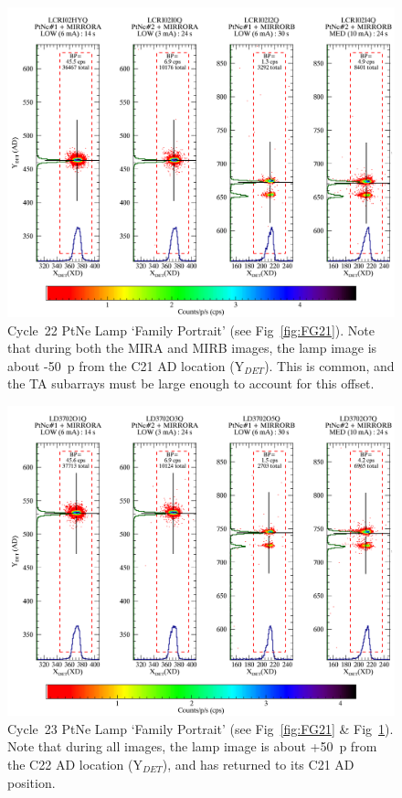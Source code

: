 \begin{center}
	\begin{figure}[htb]
	\noindent\includegraphics*[width=1.0\linewidth]{png/C22_13972_FP.png}
	\caption[C22 WCA Lamp `Family Portrait']{\footnotesize Cycle~22 PtNe Lamp `Family Portrait' (see Fig~\ref{fig:FG21}).
	Note that during both the MIRA and MIRB images, the lamp image is about -50~p from the C21 AD location (Y$_{DET}$).
	This is common, and the TA subarrays must be large enough to account for this offset.\label{fig:FG22}}
	\end{figure}
\end{center}
\begin{center}
\begin{figure}[htb]
\noindent\includegraphics*[width=1.0\linewidth]{png/C23_14440_FP.png}
\caption[C23 WCA Lamp `Family Portrait']{Cycle~23 PtNe Lamp `Family Portrait' (see Fig~\ref{fig:FG21} \& Fig~\ref{fig:FG22}).
	Note that during all images, the lamp image is about +50~p from the C22 AD location (Y$_{DET}$),
	and has returned to its C21 AD position.\label{fig:FG23}}
\end{figure}
\end{center}
